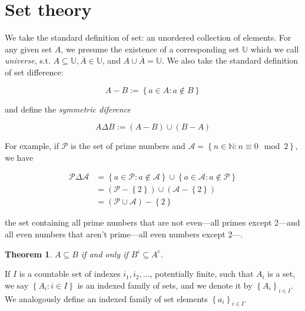 \documentclass[a4paper, 12pt]{article}
\newtheorem{theorem}{Theorem}
\newtheorem{theorem}{Theorem}
\begin{document}
\section{Set theory}%
\label{sec:Set theory}

We take the standard definition of set: an unordered collection of elements. For any given set $A$,
we presume the existence of a corresponding set $\mathbb{U}$ which we call \textit{universe}, s.t. 
$A \subseteq \mathbb{U}, \overline{A} \in \mathbb{U}$, and $A \cup \overline{A} = \mathbb{U}$.
We also take the standard definition of set difference:

\begin{equation*}
    A  - B := \left\{ a \in A : a \not\in B \right\} 
\end{equation*}

and define the \textit{symmetric diference}

\begin{equation*}
    A \Delta B := (A - B) \cup (B -A)
\end{equation*}

For example, if $\mathcal{P}$ is the set of prime numbers and $\mathcal{A} = \left\{ n \in \mathbb{N} : n \equiv 0 \mod 2 \right\} $, we have 

\begin{align*}
    \mathcal{P} \Delta \mathcal{A} &= \left\{ a \in \mathcal{P} : a \not\in \mathcal{A} \right\} \cup \left\{ a \in \mathcal{A} : a \not\in \mathcal{P} \right\}  \\ 
                                   &= (\mathcal{P} - \left\{ 2 \right\} ) \cup (\mathcal{A} - \left\{ 2 \right\} ) \\ 
                                   &= (\mathcal{P} \cup \mathcal{A}) - \left\{  2 \right\} 
\end{align*}

the set containing all prime numbers that are not even---all primes except 2---and all
even numbers that aren't prime---all even numbers except 2---.

\begin{theorem}
    $A \subseteq B$ if and only if $B^c \subseteq A^c$.
\end{theorem}

If $I$ is a countable set of indexes $i_1, i_2, \ldots$, potentially finite,
such that $A_i$ is a set, we say $\left\{ A_i : i \in I \right\} $ is an
indexed family of sets, and we denote it by $\left\{ A_i \right\}_{i \in I} $.
We analogously define an indexed family of set elements $\left\{ a_i
\right\}_{i \in I} $.
\end{document}

